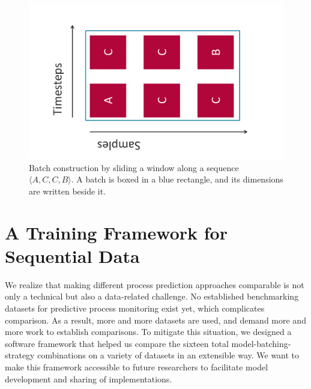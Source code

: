 \begin{figure}[!htb]
    \centering
    \includegraphics[width=.55\textwidth,angle=-90,origin=c]{gfx/windowing-strategy.pdf}
    \caption[Windowing strategy for batches]{Batch construction by sliding a window along a sequence $\langle A,C,C,B\rangle$. A batch is boxed in a blue rectangle, and its dimensions are written beside it.}
    \label{fig:windowing-strategy-example}
\end{figure}

\section{A Training Framework for Sequential Data}
\label{sec:contrib:training-framework}
We realize that making different process prediction approaches comparable is not only a technical but also a data-related challenge.
No established benchmarking datasets for predictive process monitoring exist yet, which complicates comparison.
As a result, more and more datasets are used, and demand more and more work to establish comparisons.
To mitigate this situation, we designed a software framework that helped us compare the sixteen total model-batching-strategy combinations on a variety of datasets in an extensible way.
We want to make this framework accessible to future researchers to facilitate model development and sharing of implementations.\\


